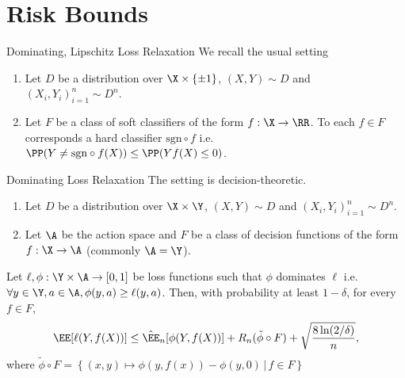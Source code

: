 \section{Risk Bounds}

\begin{frame}{Dominating, Lipschitz Loss Relaxation}
    We recall the usual setting
    \begin{enumerate}
        \item Let $D$ be a distribution over $\X\times\{\pm 1\}$, $(X,Y)\sim D$ and $(X_i,Y_i)_{i=1}^n\sim D^n$.
        \item Let $F$ be a class of soft classifiers of the form $f:\X\to \RR$. To each $f\in F$ corresponds a hard classifier $\text{sgn}\circ f$ i.e. $\PP(Y\ne \text{sgn}\circ f(X))\le \PP(Yf(X)\le 0)$.
    \end{enumerate}


\end{frame}

\begin{frame}{Dominating Loss Relaxation}
   The setting is decision-theoretic. 
    \begin{enumerate}
        \item Let $D$ be a distribution over $\X\times\Y$, $(X,Y)\sim D$ and $(X_i,Y_i)_{i=1}^n\sim D^n$.
        \item Let $\A$ be the action space and $F$ be a class of decision functions of the form $f:\X\to \A$ (commonly $\A=\Y$).
    \end{enumerate}
    \begin{mytheorem}
    \label{theorem:decison-theoretic}
        Let $\ell,\phi:\Y\times \A\to [0,1]$ be loss functions such that $\phi$ \textcolor{gustave}{dominates} $\ell$ i.e. $\forall y\in\Y,a\in\A, \phi(y,a)\ge\ell(y,a)$. Then, with probability at least $1-\delta$, for every $f\in F$,
        \begin{equation*}
            \EE[\ell(Y,f(X))] \le \hat{\EE}_n[\phi(Y,f(X))] + R_n(\tilde{\phi}\circ F) + \sqrt{\dfrac{8\ln(2/\delta)}{n}},
        \end{equation*}
        where $\tilde{\phi}\circ F = \left\{(x,y)\mapsto \phi(y,f(x)) - \phi(y,0) \,|\, f\in F\right\}$
    \end{mytheorem}
\end{frame}
